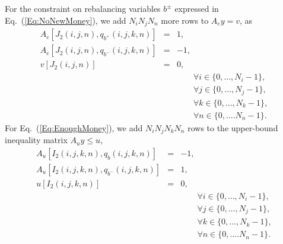 \documentclass{article}[fleqn,12pt]
\begin{document}
For the constraint on rebalancing variables  $b^\pm$ expressed in Eq.~(\ref{Eq:NoNewMoney}),
we add $N_iN_jN_n$ more rows to $A_ey = v$, as
\begin{eqnarray}
	A_e[J_2(i, j, n), q_{b^+}(i, j, k, n)] &=& 1, \nonumber \\
	A_e[J_2(i, j, n), q_{b^-}(i, j, k, n)] &=& -1, \nonumber \\
	v[J_2(i, j, n)] &=& 0, \nonumber \\
	&&\qquad\forall i \in \{0,\ldots, N_i-1\},\nonumber\\
	&&\qquad\forall j \in \{0,\ldots, N_j-1\},\nonumber\\
	&&\qquad\forall k \in \{0,\ldots, N_k-1\},\nonumber\\
	&&\qquad\forall n \in \{0,\ldots. N_n-1\}. \nonumber
\end{eqnarray}
For Eq.~(\ref{Eq:EnoughMoney}), we add $N_iN_jN_kN_n$ rows to the upper-bound
inequality matrix $A_uy\le u$,
\begin{eqnarray}
	A_u[I_2(i, j, k, n), q_{b}(i, j, k, n)] &=& -1, \nonumber \\
	A_u[I_2(i, j, k, n), q_{b^-}(i, j, k, n)] &=& 1, \nonumber \\
	u[I_2(i, j, k, n)] &=& 0, \nonumber \\
	&&\qquad\forall i \in \{0,\ldots, N_i-1\},\nonumber\\
	&&\qquad\forall j \in \{0,\ldots, N_j-1\},\nonumber\\
	&&\qquad\forall k \in \{0,\ldots, N_k-1\},\nonumber\\
	&&\qquad\forall n \in \{0,\ldots. N_n-1\}. \nonumber
\end{eqnarray}
\end{document}
